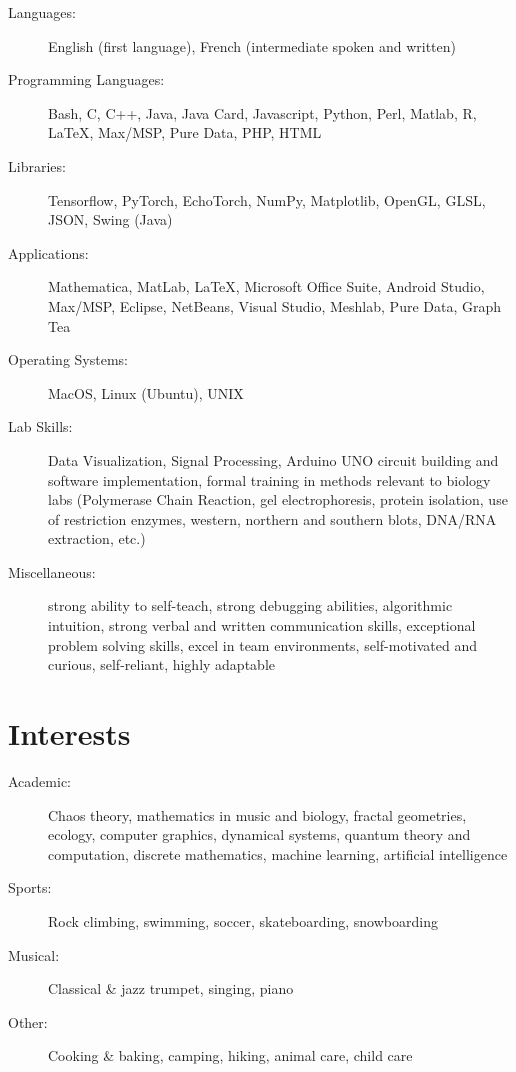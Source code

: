 \documentclass[letterpaper,11pt]{article}
\begin{document}
\begin{description}
\item[Languages:]
English (first language), French (intermediate spoken and written)

\item[Programming Languages:]
Bash, C, C++, Java, Java Card, Javascript, Python, Perl, Matlab, R, \LaTeX, Max/MSP, Pure Data, PHP, HTML

\item[Libraries:]
Tensorflow, PyTorch, EchoTorch, NumPy, Matplotlib, OpenGL, GLSL, JSON, Swing (Java)

\item[Applications:]
Mathematica, MatLab, \LaTeX, Microsoft Office Suite, Android Studio, Max/MSP, Eclipse, NetBeans, Visual Studio, Meshlab, Pure Data, Graph Tea

\item[Operating Systems:]
MacOS, Linux (Ubuntu), UNIX

\item[Lab Skills:]
Data Visualization, Signal Processing, Arduino UNO circuit building and software implementation, formal training in methods relevant to biology labs (Polymerase Chain Reaction, gel electrophoresis, protein isolation, use of restriction enzymes, western, northern and southern blots, DNA/RNA extraction, etc.)

\item[Miscellaneous:]
strong ability to self-teach, strong debugging abilities, algorithmic intuition, strong verbal and written communication skills, exceptional problem solving skills, excel in team environments, self-motivated and curious, self-reliant, highly adaptable
\end{description}

\section*{Interests}

\begin{description}
\item[Academic:] Chaos theory, mathematics in music and biology, fractal geometries, ecology, computer graphics, dynamical systems, quantum theory and computation, discrete mathematics, machine learning, artificial intelligence

\item[Sports:] Rock climbing, swimming, soccer, skateboarding, snowboarding

\item[Musical:] Classical \& jazz trumpet, singing, piano 

\item[Other:] Cooking \& baking, camping, hiking, animal care, child care
\end{description}
\end{document}
